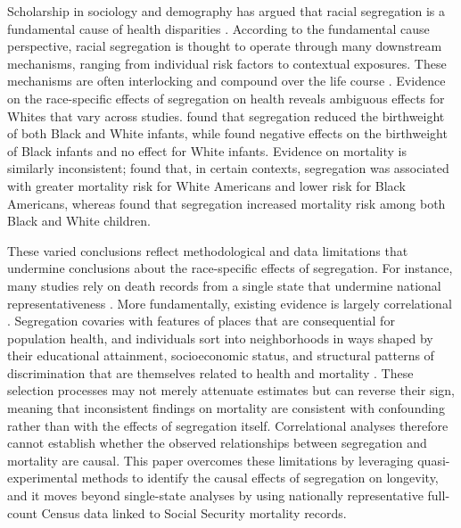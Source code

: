\documentclass[11pt]{article}
\begin{document}
Scholarship in sociology and demography has argued that racial segregation is a fundamental cause of health disparities \citep{williams_racial_2001}. According to the fundamental cause perspective, racial segregation is thought to operate through many downstream mechanisms, ranging from individual risk factors to contextual exposures. These mechanisms are often interlocking and compound over the life course \citep{breen_longevity_2024,diprete_cumulative_2006}. Evidence on the race-specific effects of segregation on health reveals ambiguous effects for Whites that vary across studies. \citet{austin_does_2016} found that segregation reduced the birthweight of both Black and White infants, while \citet{vu_born_2024} found negative effects on the birthweight of Black infants and no effect for White infants. Evidence on mortality is similarly inconsistent; \citet{logan_segregation_2018} found that, in certain contexts, segregation was associated with greater mortality risk for White Americans and lower risk for Black Americans, whereas \citet{karbeah_racial_2023} found that segregation increased mortality risk among both Black and White children. 

These varied conclusions reflect methodological and data limitations that undermine conclusions about the race-specific effects of segregation. For instance, many studies rely on death records from a single state that undermine national representativeness \citep{logan_segregation_2018}. More fundamentally, existing evidence is largely correlational \citep{kramer_is_2009,white_elucidating_2012,williams_racial_2001}. Segregation covaries with features of places that are consequential for population health, and individuals sort into neighborhoods in ways shaped by their educational attainment, socioeconomic status, and structural patterns of discrimination that are themselves related to health and mortality \citep{sampson_neighborhood_2008,sharkey_where_2014}. These selection processes may not merely attenuate estimates but can reverse their sign, meaning that inconsistent findings on mortality are consistent with confounding rather than with the effects of segregation itself. Correlational analyses therefore cannot establish whether the observed relationships between segregation and mortality are causal. This paper overcomes these limitations by leveraging quasi-experimental methods to identify the causal effects of segregation on longevity, and it moves beyond single-state analyses by using nationally representative full-count Census data linked to Social Security mortality records.
\end{document}

